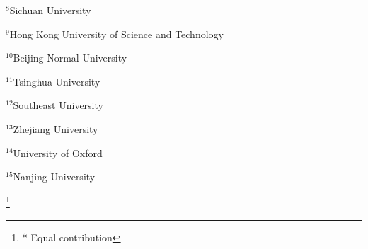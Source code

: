 \begin{flushleft}
$^{8}$Sichuan University

$^{9}$Hong Kong University of Science and Technology

$^{10}$Beijing Normal University

$^{11}$Tsinghua University

$^{12}$Southeast University

$^{13}$Zhejiang University

$^{14}$University of Oxford

$^{15}$Nanjing University

\begingroup
\renewcommand\thefootnote{}
\footnote{* Equal contribution}
\endgroup

\end{flushleft}
